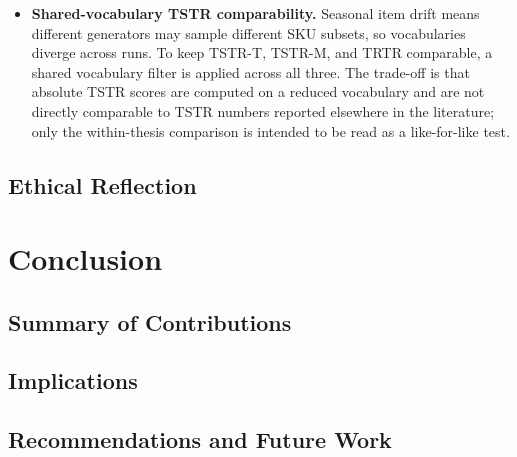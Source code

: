 \documentclass[sigconf,nonacm]{acmart}
\begin{document}
\begin{itemize}[leftmargin=*]
    coverage, popularity JSD, $\Delta$Gini) is reported alongside TSTR
    rather than absorbed into a single utility number.
  \item \textbf{Shared-vocabulary TSTR comparability.} Seasonal item
    drift means different generators may sample different SKU subsets,
    so vocabularies diverge across runs. To keep TSTR-T, TSTR-M, and
    TRTR comparable, a shared vocabulary filter is applied across all
    three. The trade-off is that absolute TSTR scores are computed on
    a reduced vocabulary and are not directly comparable to TSTR
    numbers reported elsewhere in the literature; only the
    within-thesis comparison is intended to be read as a like-for-like
    test.
\end{itemize}

\subsection{Ethical Reflection}

\section{Conclusion}
\label{sec:conclusion}

\subsection{Summary of Contributions}


\subsection{Implications}

\subsection{Recommendations and Future Work}
\end{document}
